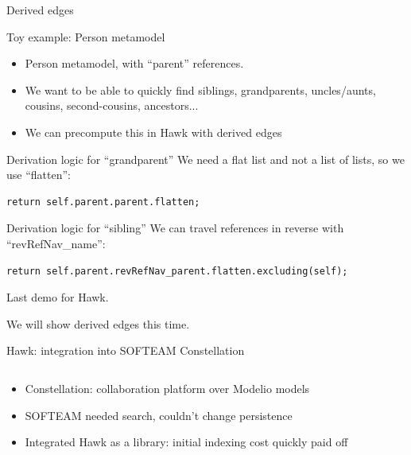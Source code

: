 \documentclass[10pt]{beamer}
\begin{document}
\begin{frame}[fragile]{Derived edges}
  \begin{block}{Toy example: Person metamodel}
    \begin{itemize}
    \item Person metamodel, with ``parent'' references.
    \item We want to be able to quickly find siblings, grandparents,
      uncles/aunts, cousins, second-cousins, ancestors...
    \item We can precompute this in Hawk with \alert{derived edges}
    \end{itemize}
  \end{block}

  \begin{block}{Derivation logic for ``grandparent''}
    We need a flat list and not a list of lists, so we use ``flatten'':
    \begin{lstlisting}[language=EOL]
      return self.parent.parent.flatten;
    \end{lstlisting}
  \end{block}

  \begin{block}{Derivation logic for ``sibling''}
    We can travel references in reverse with ``revRefNav\_name'':

    \begin{lstlisting}[language=EOL]
      return self.parent.revRefNav_parent.flatten.excluding(self);
    \end{lstlisting}
  \end{block}

\end{frame}

\begin{frame}[standout]
  Last demo for Hawk.

  We will show derived edges this time.
\end{frame}

\begin{frame}{Hawk: integration into SOFTEAM Constellation~\cite{hawkmodelio_2016}}

  \centering
  \begin{columns}
    

    
  \end{columns}

  \begin{itemize}
  \item Constellation: collaboration platform over Modelio models
  \item SOFTEAM needed search, couldn't change persistence
  \item Integrated Hawk as a library: initial indexing cost quickly paid off
  \end{itemize}
\end{frame}
\end{document}
